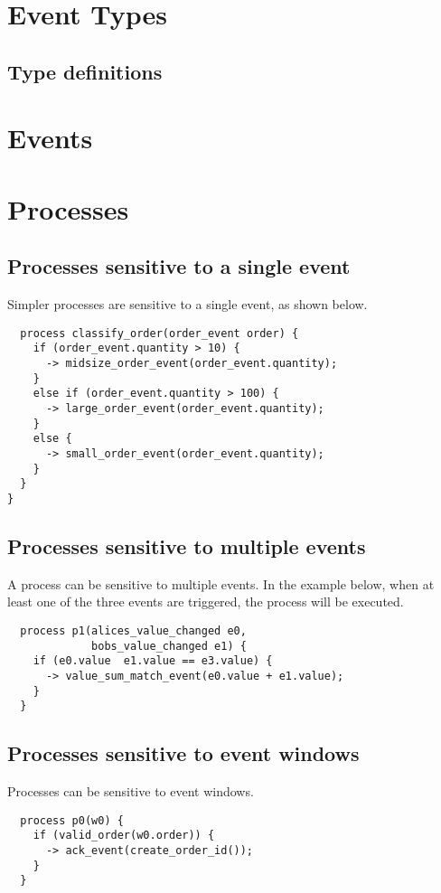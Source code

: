 \documentclass{pamsbook}
\begin{document}
{\section{Event Types}

\subsection{Type definitions}



\section{Events}

\section{Processes}
\subsection{Processes sensitive to a single event}
Simpler processes are sensitive to a single event, as shown below.

{\small
\begin{verbatim}
  process classify_order(order_event order) {
    if (order_event.quantity > 10) {
      -> midsize_order_event(order_event.quantity);
    }
    else if (order_event.quantity > 100) {
      -> large_order_event(order_event.quantity);   
    }
    else {
      -> small_order_event(order_event.quantity);
    }
  }
}
\end{verbatim}
}

\subsection{Processes sensitive to multiple events}
A process can be sensitive to multiple events. In the example below, when at
least one of the three events are triggered, the process will be executed.

{\small 
\begin{verbatim}
  process p1(alices_value_changed e0, 
             bobs_value_changed e1) {
    if (e0.value  e1.value == e3.value) {
      -> value_sum_match_event(e0.value + e1.value);
    }
  }
\end{verbatim}
}

\subsection{Processes sensitive to event windows}
Processes can be sensitive to event windows.
{\small
\begin{verbatim}
  process p0(w0) {
    if (valid_order(w0.order)) {
      -> ack_event(create_order_id());
    }
  }
\end{verbatim}
}


}
\end{document}
